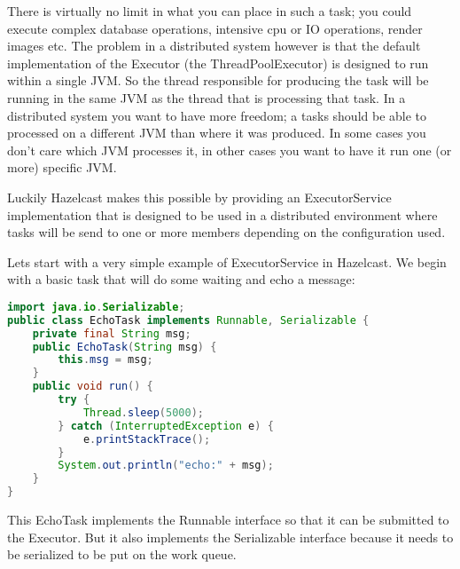 There is virtually no limit in what you can place in such a task; you could execute complex database operations, intensive cpu or IO operations, render images etc. The problem in a distributed system however is that the default implementation of the Executor (the ThreadPoolExecutor) is designed to run within a single JVM. So the thread responsible for producing the task will be running in the same JVM as the thread that is processing that task. In a distributed system you want to have more freedom; a tasks should be able to processed on a different JVM than where it was produced. In some cases you don't care which JVM processes it, in other cases you want to have it run one (or more) specific JVM.

Luckily Hazelcast makes this possible by providing an ExecutorService implementation that is designed to be used in a distributed environment where tasks will be send to one or more members depending on the configuration used.

Lets start with a very simple example of ExecutorService in Hazelcast. We begin with a basic task that will do some waiting and echo a message:
\begin{lstlisting}[language=java]
import java.io.Serializable;
public class EchoTask implements Runnable, Serializable {
    private final String msg;
    public EchoTask(String msg) {
        this.msg = msg;
    }
    public void run() {
        try {
            Thread.sleep(5000);
        } catch (InterruptedException e) {
            e.printStackTrace();
        }
        System.out.println("echo:" + msg);
    }
}
\end{lstlisting}
This EchoTask implements the Runnable interface so that it can be submitted to the Executor. But it also implements the Serializable interface because it needs to be serialized to be put on the work queue.

